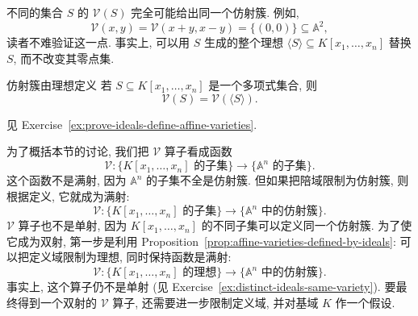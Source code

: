 不同的集合 $S$ 的 $\mathcal{V}(S)$ 完全可能给出同一个仿射簇. 例如,
\[
  \mathcal{V}(x,y)=\mathcal{V}(x+y,x-y)=\{(0,0)\}\subseteq\mathbb{A}^{2},
\]
读者不难验证这一点. 事实上, 可以用 $S$ 生成的整个理想 $\langle S\rangle\subseteq K[x_{1},\ldots,x_{n}]$ 替换 $S$, 而不改变其零点集.

\begin{Proposition}{仿射簇由理想定义}\leavevmode\label{prop:affine-varieties-defined-by-ideals}
  若 $S\subseteq K[x_{1},\ldots,x_{n}]$ 是一个多项式集合, 则
  \[
    \mathcal{V}(S)=\mathcal{V}(\langle S\rangle).
  \]
\end{Proposition}

\begin{Proof}
  见 Exercise~\ref{ex:prove-ideals-define-affine-varieties}.
\end{Proof}

为了概括本节的讨论, 我们把 $\mathcal{V}$ 算子看成函数
\[
  \mathcal{V}:\{K[x_{1},\ldots,x_{n}]\text{ 的子集}\}
    \longrightarrow\{\mathbb{A}^{n}\text{ 的子集}\}.
\]
这个函数不是满射, 因为 $\mathbb{A}^{n}$ 的子集不全是仿射簇. 但如果把陪域限制为仿射簇, 则根据定义, 它就成为满射:
\[
  \mathcal{V}:\{K[x_{1},\ldots,x_{n}]\text{ 的子集}\}
    \longrightarrow\{\mathbb{A}^{n}\text{ 中的仿射簇}\}.
\]
$\mathcal{V}$ 算子也不是单射, 因为 $K[x_{1},\ldots,x_{n}]$ 的不同子集可以定义同一个仿射簇. 为了使它成为双射, 第一步是利用 Proposition~\ref{prop:affine-varieties-defined-by-ideals}: 可以把定义域限制为理想, 同时保持函数是满射:
\[
  \mathcal{V}:\{K[x_{1},\ldots,x_{n}]\text{ 的理想}\}
    \longrightarrow\{\mathbb{A}^{n}\text{ 中的仿射簇}\}.
\]
事实上, 这个算子仍不是单射 (见 Exercise~\ref{ex:distinct-ideals-same-variety}). 要最终得到一个双射的 $\mathcal{V}$ 算子, 还需要进一步限制定义域, 并对基域 $K$ 作一个假设.


